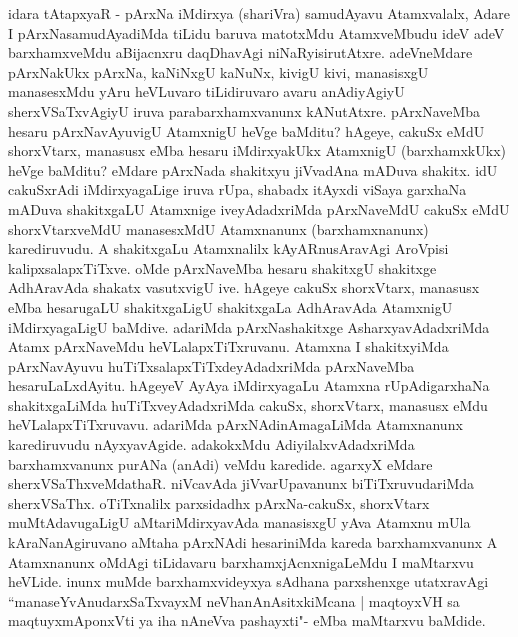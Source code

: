\begin{artha}
idara tAtapxyaR - pArxNa iMdirxya (shariVra) samudAyavu Atamxvalalx, Adare I pArxNasamudAyadiMda tiLidu baruva matotxMdu AtamxveMbudu ideV adeV barxhamxveMdu aBijacnxru daqDhavAgi niNaRyisirutAtxre. adeVneMdare pArxNakUkx pArxNa, kaNiNxgU kaNuNx, kivigU kivi, manasisxgU manasesxMdu yAru heVLuvaro tiLidiruvaro avaru anAdiyAgiyU sherxVSaTxvAgiyU iruva  parabarxhamxvanunx kANutAtxre. pArxNaveMba hesaru pArxNavAyuvigU AtamxnigU heVge baMditu? hAgeye, cakuSx eMdU shorxVtarx, manasusx eMba hesaru iMdirxyakUkx AtamxnigU (barxhamxkUkx) heVge baMditu? eMdare pArxNada shakitxyu jiVvadAna mADuva shakitx. idU cakuSxrAdi iMdirxyagaLige iruva rUpa, shabadx itAyxdi viSaya garxhaNa mADuva shakitxgaLU Atamxnige iveyAdadxriMda pArxNaveMdU cakuSx eMdU shorxVtarxveMdU manasesxMdU Atamxnanunx (barxhamxnanunx) karediruvudu. A shakitxgaLu Atamxnalilx kAyARnusAravAgi AroVpisi kalipxsalapxTiTxve. oMde pArxNaveMba hesaru shakitxgU shakitxge AdhAravAda shakatx vasutxvigU ive. hAgeye cakuSx shorxVtarx, manasusx eMba hesarugaLU shakitxgaLigU shakitxgaLa AdhAravAda AtamxnigU iMdirxyagaLigU baMdive. adariMda pArxNashakitxge AsharxyavAdadxriMda Atamx pArxNaveMdu heVLalapxTiTxruvanu. Atamxna I shakitxyiMda pArxNavAyuvu huTiTxsalapxTiTxdeyAdadxriMda pArxNaveMba hesaruLaLxdAyitu. hAgeyeV AyAya iMdirxyagaLu Atamxna rUpAdigarxhaNa shakitxgaLiMda huTiTxveyAdadxriMda cakuSx, shorxVtarx, manasusx eMdu heVLalapxTiTxruvavu. adariMda pArxNAdinAmagaLiMda Atamxnanunx karediruvudu nAyxyavAgide. adakokxMdu AdiyilalxvAdadxriMda barxhamxvanunx purANa (anAdi) veMdu karedide. agarxyX eMdare sherxVSaThxveMdathaR. niVcavAda jiVvarUpavanunx biTiTxruvudariMda sherxVSaThx. oTiTxnalilx parxsidadhx pArxNa-cakuSx, shorxVtarx muMtAdavugaLigU aMtariMdirxyavAda manasisxgU yAva Atamxnu mUla kAraNanAgiruvano aMtaha pArxNAdi hesariniMda kareda barxhamxvanunx A Atamxnanunx oMdAgi tiLidavaru barxhamxjAcnxnigaLeMdu I maMtarxvu heVLide. inunx muMde barxhamxvideyxya sAdhana parxshenxge utatxravAgi ``manaseYvAnudarxSaTxvayxM neVhanAnAsitxkiMcana | maqtoyxVH sa maqtuyxmAponxVti ya iha nAneVva pashayxti"\mdash  - eMba maMtarxvu baMdide.
\end{artha}



